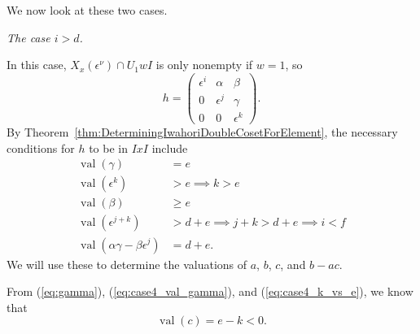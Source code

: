 \documentclass{amsart}
\theoremstyle{definition}
\def\e{\epsilon}
\def\val{\mathop{\mathrm{val}}}
\def\en{\e^{\nu}}
\def\X{X_x(\en)}
\newcommand\subsubsubsection[1]{\vspace{0.5em}\begin{paragraph}{}\noindent \normalfont\large\itshape #1. \end{paragraph}\vspace{0.5em}}
\begin{document}
  We now look at these two cases.

  \subsubsubsection{The case $i > d$}
  In this case, $\X \cap U_1 w I$ is only nonempty if $w = 1$, so
  \begin{equation*}
    h = \begin{pmatrix}
      \e^i & \alpha & \beta \\
      0 & \e^j & \gamma \\
      0 & 0 & \e^k
    \end{pmatrix}.
  \end{equation*}
  By Theorem~\ref{thm:DeterminingIwahoriDoubleCosetForElement}, the necessary
  conditions for $h$ to be in $IxI$ include
  \begin{align}
    \label{eq:case4_val_gamma}
    \val(\gamma) &= e \\
    \label{eq:case4_k_vs_e}
    \val(\e^k) &> e \implies k > e \\
    \label{eq:case4_val_beta}
    \val(\beta) &\ge e \\
    \label{eq:case4_i_vs_f}
    \val(\e^{j+k}) &> d + e \implies j + k > d + e \implies i < f \\
    \label{eq:case4_val_minor}
    \val(\alpha\gamma - \beta\e^j) &= d + e.
  \end{align}
  We will use these to determine the valuations of $a$, $b$, $c$, and $b -
  ac$.

  From (\ref{eq:gamma}), (\ref{eq:case4_val_gamma}), and
  (\ref{eq:case4_k_vs_e}), we know that
  \begin{equation}
    \label{eq:case4_val_c}
    \val(c) = e - k < 0.
  \end{equation}
\end{document}
